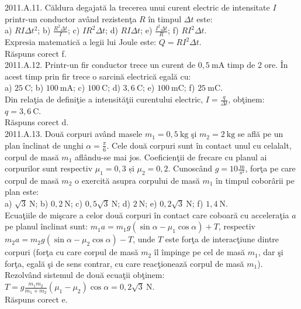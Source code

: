 2011.A.11. Căldura degajată la trecerea unui curent electric de intensitate $I$ printr-un conductor având rezistenţa $R$ în timpul $\Delta t$ este:\\ a) $R I \Delta t^{2}$; b) $\frac{R^{2} \Delta t}{I}$; c) $I R^{2} \Delta t$; d) $R I \Delta t$; e) $\frac{I^{2} \Delta t}{R}$; f) $R I^{2} \Delta t$.\\ Expresia matematică a legii lui Joule este: $Q=R I^{2} \Delta t$.\\ Răspuns corect f.\\

2011.A.12. Printr-un fir conductor trece un curent de $0,5 \mathrm{~mA}$ timp de 2 ore. În acest timp prin fir trece o sarcină electrică egală cu:\\ a) $25 \mathrm{~C}$; b) $100 \mathrm{~mA}$; c) $100 \mathrm{~C}$; d) $3,6 \mathrm{~C}$; e) $100 \mathrm{~mC}$; f) $25 \mathrm{~mC}$.\\ Din relaţia de definiţie a intensităţii curentului electric, $I=\frac{q}{\Delta t}$, obţinem: $q=3,6 \mathrm{~C}$.\\ Răspuns corect d.\\

2011.A.13. Două corpuri având masele $m_{1}=0,5 \mathrm{~kg}$ şi $m_{2}=2 \mathrm{~kg}$ se află pe un plan înclinat de unghi $\alpha=\frac{\pi}{6}$. Cele două corpuri sunt în contact unul cu celalalt, corpul de masă $m_{1}$ aflându-se mai jos. Coeficienţii de frecare cu planul ai corpurilor sunt respectiv $\mu_{1}=0,3$ și $\mu_{2}=0,2$. Cunoscând $g=10 \frac{\mathrm{~m}}{\mathrm{~s}^{2}}$, forţa pe care corpul de masă $m_{2}$ o exercită asupra corpului de masă $m_{1}$ în timpul coborârii pe plan este:\\ a) $\sqrt{3} \mathrm{~N}$; b) $0,2 \mathrm{~N}$; c) $0,5 \sqrt{3} \mathrm{~N}$; d) $2 \mathrm{~N}$; e) $0,2 \sqrt{3} \mathrm{~N}$; f) $1,4 \mathrm{~N}$.\\ Ecuaţiile de mişcare a celor două corpuri în contact care coboară cu acceleraţia $a$ pe planul înclinat sunt: $m_{1} a=m_{1} g\left(\sin \alpha-\mu_{1} \cos \alpha\right)+T$, respectiv $m_{2} a=m_{2} g\left(\sin \alpha-\mu_{2} \cos \alpha\right)-T$, unde $T$ este forţa de interacţiune dintre corpuri (forţa cu care corpul de masă $m_{2}$ îl împinge pe cel de masă $m_{1}$, dar şi forţa, egală şi de sens contrar, cu care reacţionează corpul de masă $m_{1}$). Rezolvând sistemul de două ecuaţii obţinem: $T=g \frac{m_{1} m_{2}}{m_{1}+m_{2}}\left(\mu_{1}-\mu_{2}\right) \cos \alpha=0,2 \sqrt{3} \mathrm{~N}$.\\ Răspuns corect e.\\

